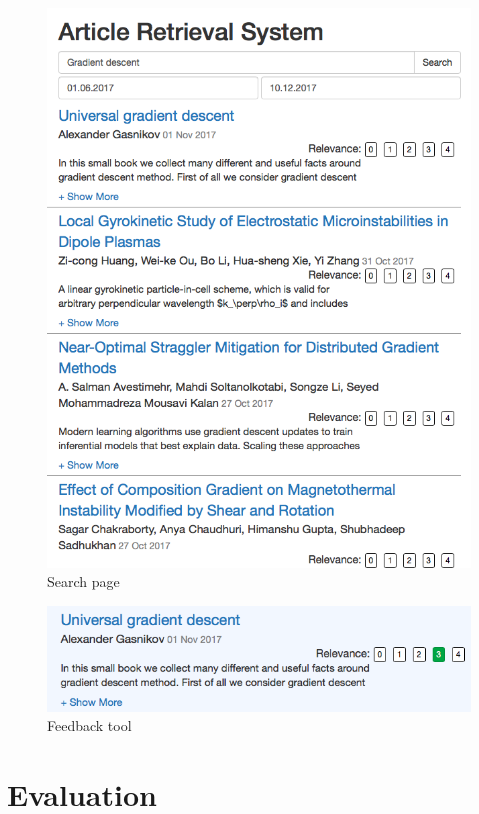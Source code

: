 \begin{figure}
  \includegraphics[width=\linewidth]{screenshot_1.png}
  \caption{Search page}
  \label{fig:search_page}
\end{figure}

\begin{figure}
  \includegraphics[width=\linewidth]{screenshot_2.png}
  \caption{Feedback tool}
  \label{fig:search_page}
\end{figure}

\section{Evaluation}

